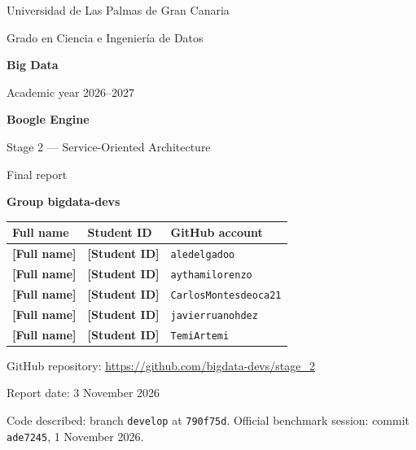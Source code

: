 \documentclass[10pt,a4paper]{article}
\newcommand{\placeholder}[1]{\textcolor{placeholderc}{\textbf{[#1]}}}
\newcommand{\coursename}{Big Data}
\newcommand{\degreename}{Grado en Ciencia e Ingeniería de Datos}
\newcommand{\universityname}{Universidad de Las Palmas de Gran Canaria}
\newcommand{\academicyear}{2026--2027}
\newcommand{\projecttitle}{Boogle Engine}
\newcommand{\groupname}{bigdata-devs}
\newcommand{\repourl}{https://github.com/bigdata-devs/stage_2}
\newcommand{\memberAname}{\placeholder{Full name}}\newcommand{\memberAid}{\placeholder{Student ID}}\newcommand{\memberAgit}{aledelgadoo}
\newcommand{\memberBname}{\placeholder{Full name}}\newcommand{\memberBid}{\placeholder{Student ID}}\newcommand{\memberBgit}{aythamilorenzo}
\newcommand{\memberCname}{\placeholder{Full name}}\newcommand{\memberCid}{\placeholder{Student ID}}\newcommand{\memberCgit}{CarlosMontesdeoca21}
\newcommand{\memberDname}{\placeholder{Full name}}\newcommand{\memberDid}{\placeholder{Student ID}}\newcommand{\memberDgit}{javierruanohdez}
\newcommand{\memberEname}{\placeholder{Full name}}\newcommand{\memberEid}{\placeholder{Student ID}}\newcommand{\memberEgit}{TemiArtemi}
\begin{document}
\begin{titlepage}
  \thispagestyle{empty}
  \centering
  {\large \universityname\par}
  \vspace{0.15cm}
  {\normalsize \degreename\par}
  \vspace{1.1cm}
  {\Large\bfseries \coursename\par}
  \vspace{0.15cm}
  {\normalsize Academic year \academicyear\par}

  \vspace{2.4cm}
  {\fontsize{36}{42}\selectfont\bfseries \projecttitle\par}
  \vspace{0.45cm}
  {\Large Stage 2 --- Service-Oriented Architecture\par}
  \vspace{0.2cm}
  {\large Final report\par}

  \vspace{2.0cm}
  {\normalsize\bfseries Group \groupname\par}
  \vspace{0.35cm}
  \renewcommand{\arraystretch}{1.25}
  \begin{tabular}{@{}lll@{}}
    \toprule
    Full name & Student ID & GitHub account \\
    \midrule
    \memberAname & \memberAid & \texttt{\memberAgit} \\
    \memberBname & \memberBid & \texttt{\memberBgit} \\
    \memberCname & \memberCid & \texttt{\memberCgit} \\
    \memberDname & \memberDid & \texttt{\memberDgit} \\
    \memberEname & \memberEid & \texttt{\memberEgit} \\
    \bottomrule
  \end{tabular}

  \vspace{1.1cm}
  {\normalsize GitHub repository: \url{\repourl}\par}

  \vfill
  {\small
   Report date: 3 November 2026\par
   Code described: branch \texttt{develop} at \texttt{790f75d}.
   Official benchmark session: commit \texttt{ade7245}, 1 November 2026.\par}
\end{titlepage}
\end{document}
